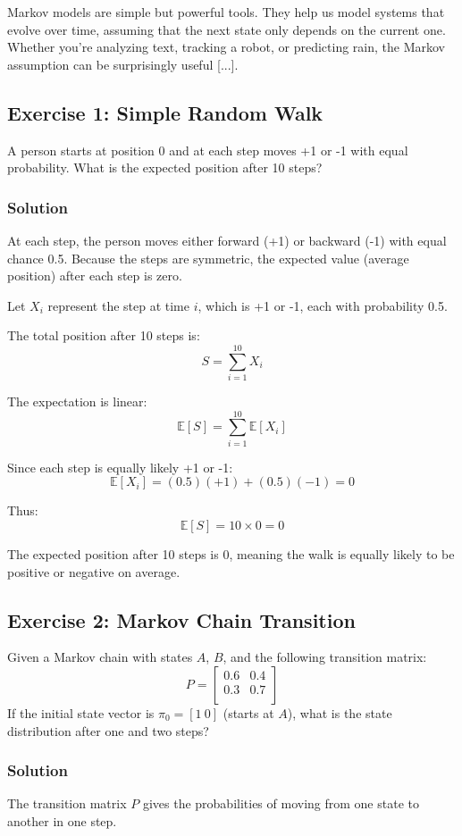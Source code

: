 \documentclass{book}
\begin{document}
Markov models are simple but powerful tools. They help us model systems that evolve over time, assuming that the next state only depends on the current one. Whether you’re analyzing text, tracking a robot, or predicting rain, the Markov assumption can be surprisingly useful [...].

\newpage

\subsection*{Exercise 1: Simple Random Walk}
A person starts at position 0 and at each step moves +1 or -1 with equal probability. What is the expected position after 10 steps?

\subsubsection*{Solution}
At each step, the person moves either forward (+1) or backward (-1) with equal chance 0.5. Because the steps are symmetric, the expected value (average position) after each step is zero.

Let $X_i$ represent the step at time $i$, which is +1 or -1, each with probability 0.5.

The total position after 10 steps is:
\[
S = \sum_{i=1}^{10} X_i
\]

The expectation is linear:
\[
\mathbb{E}[S] = \sum_{i=1}^{10} \mathbb{E}[X_i]
\]

Since each step is equally likely +1 or -1:
\[
\mathbb{E}[X_i] = (0.5)(+1) + (0.5)(-1) = 0
\]

Thus:
\[
\mathbb{E}[S] = 10 \times 0 = 0
\]

The expected position after 10 steps is 0, meaning the walk is equally likely to be positive or negative on average.

\subsection*{Exercise 2: Markov Chain Transition}
Given a Markov chain with states $A$, $B$, and the following transition matrix:
\[
P = \begin{bmatrix}
0.6 & 0.4 \\
0.3 & 0.7 \\
\end{bmatrix}
\]
If the initial state vector is $\pi_0 = [1\ 0]$ (starts at $A$), what is the state distribution after one and two steps?

\subsubsection*{Solution}
The transition matrix $P$ gives the probabilities of moving from one state to another in one step.
\end{document}
